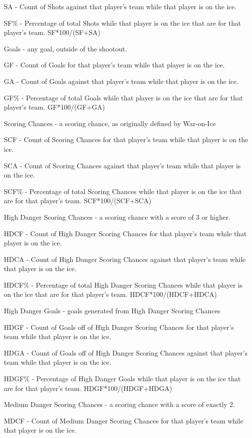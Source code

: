 \documentclass[12pt]{article}
\begin{document}
SA - Count of Shots against that player's team while that player is on the ice.

SF\% - Percentage of total Shots while that player is on the ice that are for that player's team. SF*100/(SF+SA)

Goals - any goal, outside of the shootout.

GF - Count of Goals for that player's team while that player is on the ice.

GA - Count of Goals against that player's team while that player is on the ice.

GF\% - Percentage of total Goals while that player is on the ice that are for that player's team. GF*100/(GF+GA)

Scoring Chances - a scoring chance, as originally defined by War-on-Ice

SCF - Count of Scoring Chances for that player's team while that player is on the ice.

SCA - Count of Scoring Chances against that player's team while that player is on the ice.

SCF\% - Percentage of total Scoring Chances while that player is on the ice that are for that player's team. SCF*100/(SCF+SCA)

High Danger Scoring Chances - a scoring chance with a score of 3 or higher.

HDCF - Count of High Danger Scoring Chances for that player's team while that player is on the ice.

HDCA - Count of High Danger Scoring Chances against that player's team while that player is on the ice.

HDCF\% - Percentage of total High Danger Scoring Chances while that player is on the ice that are for that player's team. HDCF*100/(HDCF+HDCA)

High Danger Goals - goals generated from High Danger Scoring Chances

HDGF - Count of Goals off of High Danger Scoring Chances for that player's team while that player is on the ice.

HDGA - Count of Goals off of High Danger Scoring Chances against that player's team while that player is on the ice.

HDGF\% - Percentage of High Danger Goals while that player is on the ice that are for that player's team. HDGF*100/(HDGF+HDGA)

Medium Danger Scoring Chances - a scoring chance with a score of exactly 2.

MDCF - Count of Medium Danger Scoring Chances for that player's team while that player is on the ice.
\end{document}
